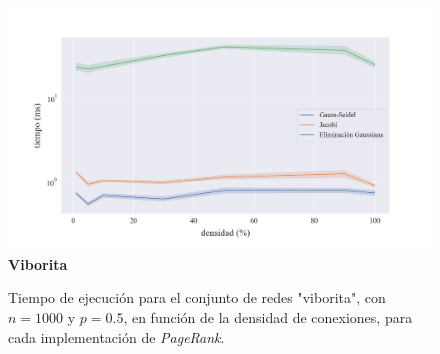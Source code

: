 \begin{figure}[!htbp]
    \centering
    \includegraphics[width=1\textwidth, trim=0 0 0 30]{files/src/.media/densidad_viborita.png}
    \textbf{Viborita}\par
    \caption{Tiempo de ejecución para el conjunto de redes "viborita", con $n = 1000$ y $p = 0.5$, en función de la densidad de conexiones, para cada implementación de \textit{PageRank}.}
    \label{densidad_viborita}
\end{figure}
